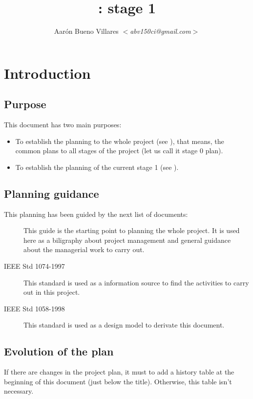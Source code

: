 \documentclass[twocolumn]{article}
\title{\fav: \favpl stage 1}
\author{Aarón Bueno Villares \textit{$<$abv150ci@gmail.com$>$}}
\begin{document}
\twocolumn[
  \maketitle
]

\tableofcontents

\section{Introduction}
\subsection{Purpose}
This document has two main purposes:

\begin{itemize}
\item To establish the planning to the whole project (see
  ), that means, the common plans to all stages
  of the project (let us call it stage 0 plan).
\item To establish the planning of the current stage 1 (see
  ).
\end{itemize}

\subsection{Planning guidance}
This planning has been guided by the next list of documents:

\begin{description}
  \item[\pmbok] This guide is the starting point to planning the
    whole project. It is used here as a biligraphy about project
    management and general guidance about the managerial work to carry
    out.
  \item[IEEE Std 1074-1997] This standard is used as a information
    source to find the activities to carry out in this project.
  \item[IEEE Std 1058-1998] This standard is used as a design model
    to derivate this document.
\end{description}

\subsection{Evolution of the plan}
If there are changes in the project plan, it must to add a history
table at the beginning of this document (just below the
title). Otherwise, this table isn't necessary.
\end{document}
